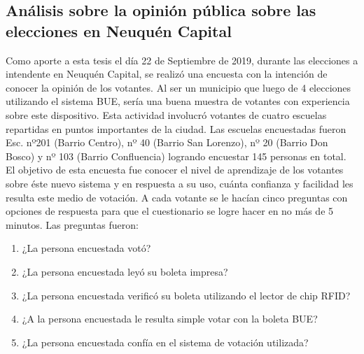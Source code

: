 \subsection{Análisis sobre la opinión pública sobre las elecciones en Neuquén Capital}
\label{encuesta}
Como aporte a esta tesis el día 22 de Septiembre de 2019, durante las elecciones a intendente en Neuquén Capital, se realizó una encuesta con la intención de conocer la opinión de los votantes. Al ser un municipio que luego de 4 elecciones utilizando el sistema BUE, sería una buena muestra de votantes con experiencia sobre este dispositivo. Esta actividad involucró votantes de cuatro escuelas repartidas en puntos importantes de la ciudad. Las escuelas encuestadas fueron Esc. nº201 (Barrio Centro), nº 40 (Barrio San Lorenzo), nº 20 (Barrio Don Bosco) y nº 103 (Barrio Confluencia) logrando encuestar 145 personas en total. \newline
El objetivo de esta encuesta fue conocer el nivel de aprendizaje de los votantes sobre éste nuevo sistema y en respuesta a su uso, cuánta confianza y facilidad les resulta este medio de votación. A cada votante se le hacían cinco preguntas con opciones de respuesta para que el cuestionario se logre hacer en no más de 5 minutos. Las preguntas fueron:
\begin{enumerate}
    \item ¿La persona encuestada votó?
    \item ¿La persona encuestada leyó su boleta impresa?
    \item ¿La persona encuestada verificó su boleta utilizando el lector de chip RFID?
    \item ¿A la persona encuestada le resulta simple votar con la boleta BUE?
    \item ¿La persona encuestada confía en el sistema de votación utilizada?
\end{enumerate}


